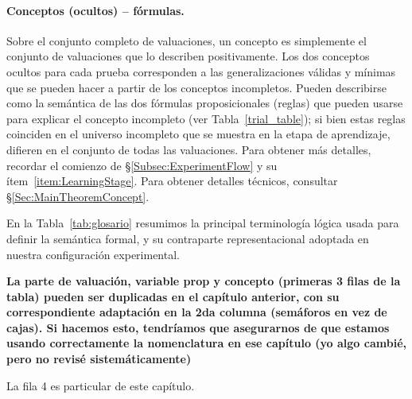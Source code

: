\paragraph{Conceptos (ocultos) -- fórmulas.}
Sobre el conjunto completo de valuaciones, un concepto es simplemente el conjunto de valuaciones que lo describen positivamente. Los dos conceptos ocultos para cada prueba corresponden a las generalizaciones válidas y mínimas que se pueden hacer a partir de los conceptos incompletos. Pueden describirse como la semántica de las dos fórmulas proposicionales (reglas) que pueden usarse para explicar el concepto incompleto (ver Tabla~\ref{trial_table}); si bien estas reglas coinciden en el universo incompleto que se muestra en la etapa de aprendizaje, difieren en el conjunto de todas las valuaciones. Para obtener más detalles, recordar el comienzo de \S\ref{Subsec:ExperimentFlow} y su ítem~\ref{item:LearningStage}. Para obtener detalles técnicos, consultar \S\ref{Sec:MainTheoremConcept}.

\bigskip

En la Tabla~\ref{tab:glosario} resumimos la principal terminología lógica usada para definir la semántica formal, y su contraparte representacional adoptada en nuestra configuración experimental.

\color{magenta}
{\bf La parte de valuación, variable prop y concepto (primeras 3 filas de la tabla) pueden ser duplicadas en el capítulo anterior, con su correspondiente adaptación en la 2da columna (semáforos en vez de cajas). Si hacemos esto, tendríamos que asegurarnos de que estamos usando correctamente la nomenclatura en ese capítulo (yo algo cambié, pero no revisé sistemáticamente)

La fila 4 es particular de este capítulo. }
\color{black}

